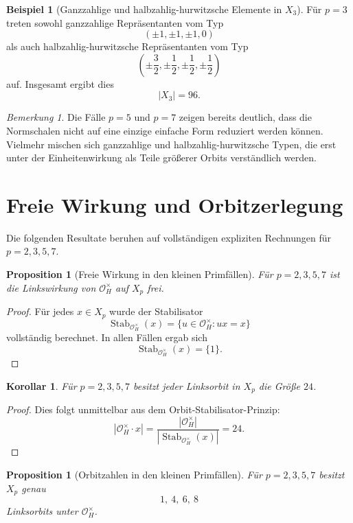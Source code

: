 \documentclass[12pt,a4paper]{article}
\theoremstyle{plain}
\newtheorem{proposition}[satz]{Proposition}
\newtheorem{korollar}[satz]{Korollar}
\theoremstyle{definition}
\newtheorem{beispiel}[satz]{Beispiel}
\theoremstyle{remark}
\newtheorem{bemerkung}[satz]{Bemerkung}
\newcommand{\OH}{\mathcal O_H}
\newcommand{\Stab}{\operatorname{Stab}}
\begin{document}
	\begin{beispiel}[Ganzzahlige und halbzahlig-hurwitzsche Elemente in \(X_3\)]
		Für \(p=3\) treten sowohl ganzzahlige Repräsentanten vom Typ
		\[
		(\pm1,\pm1,\pm1,0)
		\]
		als auch halbzahlig-hurwitzsche Repräsentanten vom Typ
		\[
		\left(\pm\frac32,\pm\frac12,\pm\frac12,\pm\frac12\right)
		\]
		auf. Insgesamt ergibt dies
		\[
		|X_3|=96.
		\]
	\end{beispiel}
	
	\begin{bemerkung}
		Die Fälle \(p=5\) und \(p=7\) zeigen bereits deutlich, dass die Normschalen nicht auf eine einzige
		einfache Form reduziert werden können. Vielmehr mischen sich ganzzahlige und halbzahlig-hurwitzsche
		Typen, die erst unter der Einheitenwirkung als Teile größerer Orbits verständlich werden.
	\end{bemerkung}
	
	\section{Freie Wirkung und Orbitzerlegung}
	
	Die folgenden Resultate beruhen auf vollständigen expliziten Rechnungen für \(p=2,3,5,7\).
	
	\begin{proposition}[Freie Wirkung in den kleinen Primfällen]
		Für \(p=2,3,5,7\) ist die Linkswirkung von \(\OH^\times\) auf \(X_p\) frei.
	\end{proposition}
	
	\begin{proof}
		Für jedes \(x\in X_p\) wurde der Stabilisator
		\[
		\Stab_{\OH^\times}(x)=\{u\in \OH^\times:ux=x\}
		\]
		vollständig berechnet. In allen Fällen ergab sich
		\[
		\Stab_{\OH^\times}(x)=\{1\}.
		\]
	\end{proof}
	
	\begin{korollar}
		Für \(p=2,3,5,7\) besitzt jeder Linksorbit in \(X_p\) die Größe \(24\).
	\end{korollar}
	
	\begin{proof}
		Dies folgt unmittelbar aus dem Orbit-Stabilisator-Prinzip:
		\[
		|\OH^\times\cdot x|
		=
		\frac{|\OH^\times|}{|\Stab_{\OH^\times}(x)|}
		=
		24.
		\]
	\end{proof}
	
	\begin{proposition}[Orbitzahlen in den kleinen Primfällen]
		Für \(p=2,3,5,7\) besitzt \(X_p\) genau
		\[
		1,\ 4,\ 6,\ 8
		\]
		Linksorbits unter \(\OH^\times\).
	\end{proposition}
	
\end{document}
